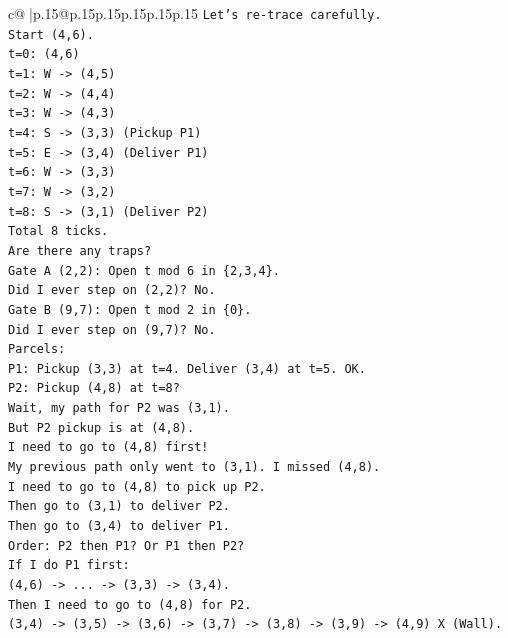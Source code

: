 \documentclass{article}
\begin{document}
{\begin{supertabular}{c@{$\;$}|p{.15\linewidth}@{}p{.15\linewidth}p{.15\linewidth}p{.15\linewidth}p{.15\linewidth}p{.15\linewidth}}
{{{\texttt{Let's re{-}trace carefully.} \\
\texttt{Start (4,6).} \\
\texttt{t=0: (4,6)} \\
\texttt{t=1: W {-}> (4,5)} \\
\texttt{t=2: W {-}> (4,4)} \\
\texttt{t=3: W {-}> (4,3)} \\
\texttt{t=4: S {-}> (3,3) (Pickup P1)} \\
\texttt{t=5: E {-}> (3,4) (Deliver P1)} \\
\texttt{t=6: W {-}> (3,3)} \\
\texttt{t=7: W {-}> (3,2)} \\
\texttt{t=8: S {-}> (3,1) (Deliver P2)} \\
\texttt{Total 8 ticks.} \\
\texttt{Are there any traps?} \\
\texttt{Gate A (2,2): Open t mod 6 in \{2,3,4\}.} \\
\texttt{Did I ever step on (2,2)? No.} \\
\texttt{Gate B (9,7): Open t mod 2 in \{0\}.} \\
\texttt{Did I ever step on (9,7)? No.} \\
\texttt{Parcels:} \\
\texttt{P1: Pickup (3,3) at t=4. Deliver (3,4) at t=5. OK.} \\
\texttt{P2: Pickup (4,8) at t=8?} \\
\texttt{Wait, my path for P2 was (3,1).} \\
\texttt{But P2 pickup is at (4,8).} \\
\texttt{I need to go to (4,8) first!} \\
\texttt{My previous path only went to (3,1). I missed (4,8).} \\
\texttt{I need to go to (4,8) to pick up P2.} \\
\texttt{Then go to (3,1) to deliver P2.} \\
\texttt{Then go to (3,4) to deliver P1.} \\
\texttt{Order: P2 then P1? Or P1 then P2?} \\
\texttt{If I do P1 first:} \\
\texttt{(4,6) {-}> ... {-}> (3,3) {-}> (3,4).} \\
\texttt{Then I need to go to (4,8) for P2.} \\
\texttt{(3,4) {-}> (3,5) {-}> (3,6) {-}> (3,7) {-}> (3,8) {-}> (3,9) {-}> (4,9) X (Wall).} \\
}}}
\end{supertabular}}
\end{document}
